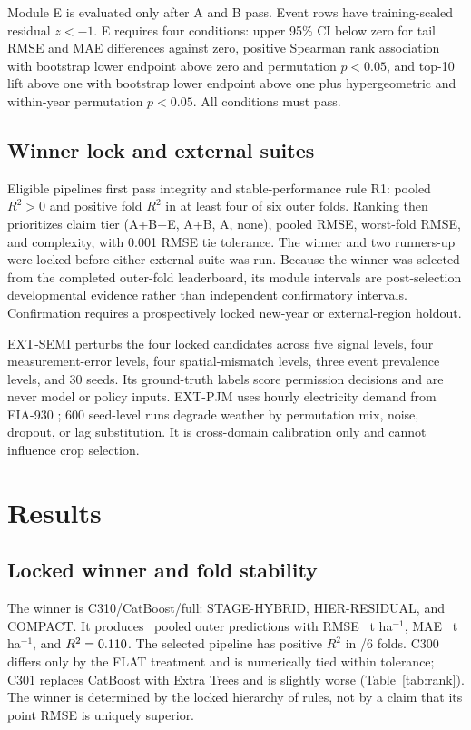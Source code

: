 \documentclass[conference]{IEEEtran}
\begin{document}
Module E is evaluated only after A and B pass. Event rows have training-scaled
residual $z<-1$. E requires four conditions: upper 95\% CI below zero for tail
RMSE and MAE differences against zero, positive Spearman rank association with
bootstrap lower endpoint above zero and permutation $p<0.05$, and top-10 lift
above one with bootstrap lower endpoint above one plus hypergeometric and
within-year permutation $p<0.05$. All conditions must pass.

\subsection{Winner lock and external suites}
Eligible pipelines first pass integrity and stable-performance rule R1: pooled
$R^2>0$ and positive fold $R^2$ in at least four of six outer folds. Ranking
then prioritizes claim tier (A+B+E, A+B, A, none), pooled RMSE, worst-fold RMSE,
and complexity, with 0.001 RMSE tie tolerance. The winner and two runners-up
were locked before either external suite was run. Because the winner was
selected from the completed outer-fold leaderboard, its module intervals are
post-selection developmental evidence rather than independent confirmatory
intervals. Confirmation requires a prospectively locked new-year or
external-region holdout.

EXT-SEMI perturbs the four locked candidates across five signal levels, four
measurement-error levels, four spatial-mismatch levels, three event prevalence
levels, and 30 seeds. Its ground-truth labels score permission decisions and
are never model or policy inputs. EXT-PJM uses hourly electricity demand from
EIA-930 \cite{EIA930}; 600 seed-level runs degrade weather by permutation mix,
noise, dropout, or lag substitution. It is cross-domain calibration only and
cannot influence crop selection.

\section{Results}
\subsection{Locked winner and fold stability}
The winner is C310/CatBoost/full: STAGE-HYBRID, HIER-RESIDUAL, and COMPACT.
It produces \ExtRows\ pooled outer predictions with RMSE \ExtRMSE\ t
ha$^{-1}$, MAE \ExtMAE\ t ha$^{-1}$, and $R^2=0.110$. The selected
pipeline has positive $R^2$ in \ExtPositiveFolds/6 folds. C300 differs only by
the FLAT treatment and is numerically tied within tolerance; C301 replaces
CatBoost with Extra Trees and is slightly worse (Table~\ref{tab:rank}). The
winner is determined by the locked hierarchy of rules, not by a claim that its
point RMSE is uniquely superior.
\end{document}
